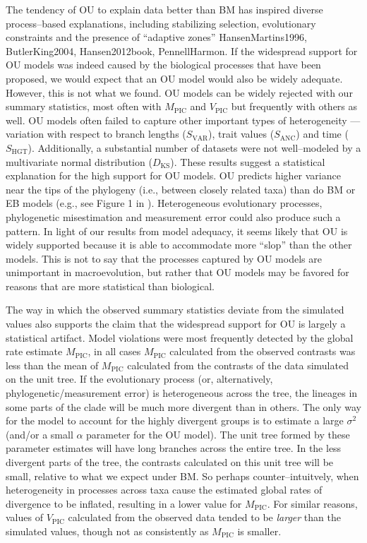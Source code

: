 \documentclass[a4paper,12pt]{article}
\begin{document}
The tendency of OU to explain data better than BM has inspired diverse process--based explanations, including stabilizing selection, evolutionary constraints and the presence of ``adaptive zones'' {HansenMartins1996, ButlerKing2004, Hansen2012book, PennellHarmon}. 
If the widespread support for OU models was indeed caused by the biological processes that have been proposed, we would expect that an OU model would also be widely adequate. However, this is not what we found. OU models can be widely rejected with our summary statistics, most often with $M_{\text{PIC}}$ and $V_{\text{PIC}}$ but frequently with others as well. OU models often failed to capture other important types of heterogeneity --- variation with respect to branch lengths ($S_{\text{VAR}}$), trait values ($S_{\text{ANC}}$) and time ($S_{\text{HGT}}$). Additionally, a substantial number of datasets were not well--modeled by a multivariate normal distribution ($D_{\text{KS}}$). These results suggest a statistical explanation for the high support for OU models. OU predicts higher variance near the tips of the phylogeny (i.e., between closely related taxa) than do BM or EB models (e.g., see Figure 1 in \citep{Harmon2010}). Heterogeneous evolutionary processes, phylogenetic misestimation and measurement error \citep{Houle2011, Hansen2012} could also produce such a pattern. In light of our results from model adequacy, it seems likely that OU is widely supported because it is able to accommodate more ``slop'' than the other models.  This is not to say that the processes captured by OU models are unimportant in macroevolution, but rather that OU models may be favored for reasons that are more statistical than biological.

The way in which the observed summary statistics deviate from the simulated values also supports the claim that the widespread support for OU is largely a statistical artifact. 
Model violations were most frequently detected by the global rate estimate $M_{\text{PIC}}$, in all cases $M_{\text{PIC}}$ calculated from the observed contrasts was less than the mean of $M_{\text{PIC}}$ calculated from the contrasts of the data simulated on the unit tree. If the evolutionary process (or, alternatively, phylogenetic/measurement error) is heterogeneous across the tree, the lineages in some parts of the clade will be much more divergent than in others. The only way for the model to account for the highly divergent groups is to estimate a large $\sigma^2$ (and/or a small $\alpha$ parameter for the OU model). The unit tree formed by these parameter estimates will have long branches across the entire tree. In the less divergent parts of the tree, the contrasts calculated on this unit tree will be small, relative to what we expect under BM. So perhaps counter--intuitvely, when heterogeneity in processes across taxa cause the estimated global rates of divergence to be inflated, resulting in a lower value for $M_{\text{PIC}}$. For similar reasons, values of $V_{\text{PIC}}$ calculated from the observed data tended to be \emph{larger} than the simulated values, though not as consistently as $M_{\text{PIC}}$ is smaller. 
\end{document}
